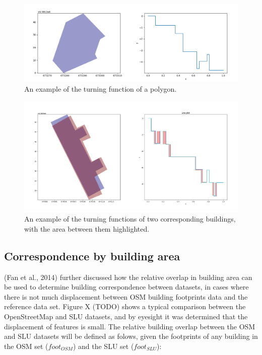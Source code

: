 \documentclass[a4paper]{article}
\begin{document}
\begin{figure}[H]
    \centering
    \includegraphics[width=\textwidth,height=0.5\textheight,keepaspectratio]{img_turn_function}
    \caption{An example of the turning function of a polygon.}
    \label{fig:space}
\end{figure}

\begin{figure}[H]
    \centering
    \includegraphics[width=\textwidth,height=0.5\textheight,keepaspectratio]{img_turn_function_diff_filled}
    \caption{An example of the turning functions of two corresponding buildings, with the area between them highlighted.}
    \label{fig:space}
\end{figure}

\subsection{Correspondence by building area}

(Fan et al., 2014) further discussed how the relative overlap in building area can be used to determine building correspondence between datasets, in cases where there is not much displacement between OSM building footprints data and the reference data set. Figure X (TODO) shows a typical comparison between the OpenStreetMap and SLU datasets, and by eyesight it was determined that the displacement of features is small. The relative building overlap between the OSM and SLU datasets will be defined as folows, given the footprints of any building in the OSM set ($foot_{OSM}$) and the SLU set ($foot_{SLU}$):
\end{document}
